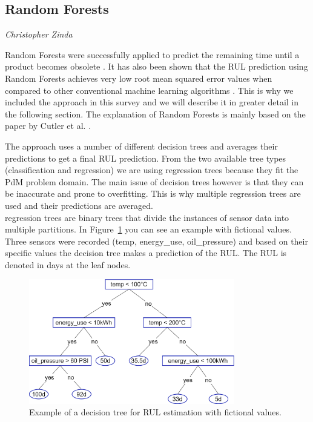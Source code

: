 \subsection{Random Forests}
\vspace*{-12.5mm}\hfill{\normalsize\emph{Christopher Zinda}}
\label{sec:rul_estimation:approaches:random_forests}

Random Forests were successfully applied to predict the remaining time until a product becomes obsolete \cite{GSCH:jennings2016forecasting}. It has also been shown that the RUL prediction using Random Forests achieves very low root mean squared error values when compared to other conventional machine learning algorithms \cite{GSCH:mathew2017prediction}. This is why we included the approach in this survey and we will describe it in greater detail in the following section. The explanation of Random Forests is mainly based on the paper by Cutler et al. \cite{GSCH:cutler2012random}.

The approach uses a number of different decision trees and averages their predictions to get a final RUL prediction. From the two available tree types (classification and regression) we are using regression trees because they fit the PdM problem domain. The main issue of decision trees however is that they can be inaccurate and prone to overfitting. This is why multiple regression trees are used and their predictions are averaged.\\
regression trees are binary trees that divide the instances of sensor data into multiple partitions. In Figure~\ref{fig:decision_tree_rul} you can see an example with fictional values. Three sensors were recorded (temp, energy\_use, oil\_pressure) and based on their specific values the decision tree makes a prediction of the RUL. The RUL is denoted in days at the leaf nodes.
\begin{figure}[ht]
    \centering
    \includegraphics[width=0.8\textwidth]{gfx/rul_decision_tree.drawio}
    \caption{Example of a decision tree for RUL estimation with fictional values.}
    \label{fig:decision_tree_rul}
\end{figure}

